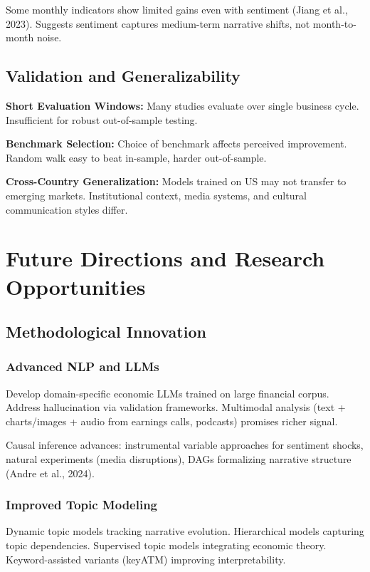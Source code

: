 \documentclass[12pt,a4paper]{article}
\begin{document}
Some monthly indicators show limited gains even with sentiment (Jiang et al., 2023). Suggests sentiment captures medium-term narrative shifts, not month-to-month noise.

\subsection{Validation and Generalizability}

\textbf{Short Evaluation Windows:} Many studies evaluate over single business cycle. Insufficient for robust out-of-sample testing.

\textbf{Benchmark Selection:} Choice of benchmark affects perceived improvement. Random walk easy to beat in-sample, harder out-of-sample.

\textbf{Cross-Country Generalization:} Models trained on US may not transfer to emerging markets. Institutional context, media systems, and cultural communication styles differ.

\section{Future Directions and Research Opportunities}
\label{sec:future}

\subsection{Methodological Innovation}

\subsubsection{Advanced NLP and LLMs}

Develop domain-specific economic LLMs trained on large financial corpus. Address hallucination via validation frameworks. Multimodal analysis (text + charts/images + audio from earnings calls, podcasts) promises richer signal.

Causal inference advances: instrumental variable approaches for sentiment shocks, natural experiments (media disruptions), DAGs formalizing narrative structure (Andre et al., 2024).

\subsubsection{Improved Topic Modeling}

Dynamic topic models tracking narrative evolution. Hierarchical models capturing topic dependencies. Supervised topic models integrating economic theory. Keyword-assisted variants (keyATM) improving interpretability.
\end{document}
